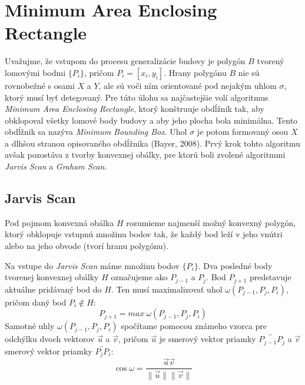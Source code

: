 \documentclass[11pt]{article}
\begin{document}
\newpage
\section{Minimum Area Enclosing Rectangle} \label{maer}
Uvažujme, že vstupom do procesu generalizácie budovy je polygón $B$ tvorený lomovými bodmi $\{P_i\}$, pričom $P_i = [x_i, y_i]$. Hrany polygónu $B$ nie sú rovnobežné s osami $X$ a $Y$, ale sú voči ním orientované pod nejakým uhlom $\sigma$, ktorý musí byť detegovaný. Pre túto úlohu sa najčastejšie volí algoritmus \textit{Minimum Area Enclosing Rectangle}, ktorý konštruuje obdĺžnik tak, aby obklopoval všetky lomové body budovy a aby jeho plocha bola minimálna. Tento obdĺžnik sa nazýva \textit{Minimum Bounding Box}. Uhol $\sigma$ je potom formovaný osou $X$ a dlhšou stranou opisovaného obdĺžnika (Bayer, 2008). Prvý krok tohto algoritmu avšak pozostáva z tvorby konvexnej obálky, pre ktorú boli zvolené algoritmmi \textit{Jarvis Scan} a \textit{Graham Scan}.

\subsection{Jarvis Scan} \label{js}
Pod pojmom konvexná obálka $H$ rozumieme najmenší možný konvexný polygón, ktorý obklopuje vstupnú množinu bodov tak, že každý bod leží v jeho vnútri alebo na jeho obvode (tvorí hranu polygónu). 

Na vstupe do \textit{Jarvis Scan} máme množinu bodov $\{P_i\}$. Dva posledné body tvorenej  konvexnej obálky $H$ označujeme ako $P_{j-1}$ a $P_j$. Bod $P_{j+1}$ predstavuje aktuálne pridávaný bod do $H$. Ten musí maximalizovať uhol $\omega(P_{j-1}, P_j, P_i)$, pričom daný bod $P_i \notin H$:
\begin{equation*}
P_{j+1} = max \: \omega(P_{j-1}, P_j, P_i) 
\end{equation*}
\noindent Samotné uhly $\omega(P_{j-1}, P_j, P_i)$ spočítame pomocou známeho vzorca pre odchýlku dvoch vektorov $\vec{u}$ a $\vec{v}$, pričom $\vec{u}$ je smerový vektor priamky $\overleftrightarrow{P_{j-1}P_j}$ a $\vec{v}$ smerový vektor priamky $\overleftrightarrow{P_jP_i}$:
\begin{equation*}
\cos\omega=\frac{\vec{u}\vec{v}}{\lVert\vec{u}\rVert\lVert\vec{v}\rVert}
\end{equation*}
\end{document}
